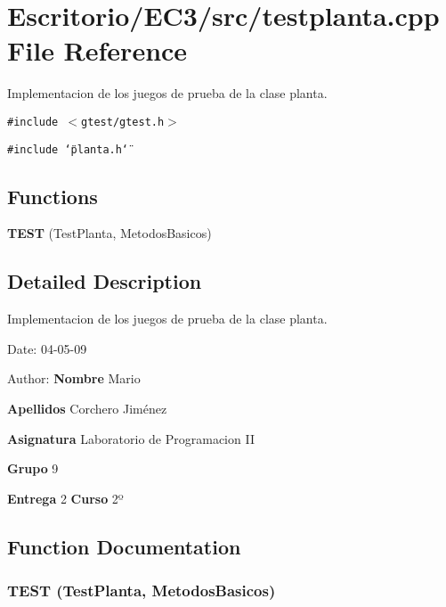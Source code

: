 \section{Escritorio/EC3/src/testplanta.cpp File Reference}
\label{testplanta_8cpp}
Implementacion de los juegos de prueba de la clase planta. 

{\tt \#include $<$gtest/gtest.h$>$}\par
{\tt \#include \char`\"{}planta.h\char`\"{}}\par
\subsection*{Functions}
\begin{CompactItemize}
\item 
{\bf TEST} (TestPlanta, MetodosBasicos)
\end{CompactItemize}


\subsection{Detailed Description}
Implementacion de los juegos de prueba de la clase planta. 

\begin{Desc}
\item[Date:]04-05-09 \end{Desc}
\begin{Desc}
\item[Author:]{\bf Nombre} Mario \par
 {\bf Apellidos} Corchero Jiménez \par
 {\bf Asignatura} Laboratorio de Programacion II \par
 {\bf Grupo} 9 \par
 {\bf Entrega} 2 {\bf Curso} 2º \end{Desc}


\subsection{Function Documentation}
\subsubsection{\setlength{\rightskip}{0pt plus 5cm}TEST (TestPlanta, MetodosBasicos)}\label{testplanta_8cpp_acd12c2ae405910d375690d81ffe0f90}


